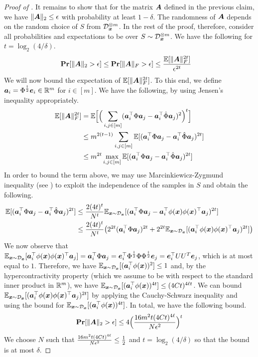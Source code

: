 \begin{proof}[Proof of ]
    It remains to show that for the matrix ${\bm{A}}$ defined in the previous claim, we have $\|{\bm{A}}\|_2 \le {\epsilon}$ with probability at least $1-\delta$. The randomness of ${\bm{A}}$ depends on the random choice of $S$ from ${\mathcal{D}}_{{\bm{x}}}^{\otimes m}$. In the rest of the proof, therefore, consider all probabilities and expectations to be over $S \sim {\mathcal{D}}_{{\bm{x}}}^{\otimes m}$. We have the following for $t = \log_2(4/\delta)$.
    \begin{align*}
        \mathbf{Pr}[\|{\bm{A}}\|_2 > {\epsilon}] &\le \mathbf{Pr}[\|{\bm{A}}\|_F > {\epsilon}] \le \frac{\mathbb{E}[\|{\bm{A}}\|_F^{2t}]}{{\epsilon}^{2t}} 
    \end{align*}
    We will now bound the expectation of $\mathbb{E}[\|{\bm{A}}\|_F^{2t}]$. To this end, we define ${\bm{a}}_i = \Phi^{\frac{\dagger}{2}} {\bm{e}}_i \in \mathbb{R}^m$ for $i\in[m]$. We have the following, by using Jensen's inequality appropriately.
    \begin{align*}
        \mathbb{E}[\|{\bm{A}}\|_F^{2t}] &= \mathbb{E}\Bigr[\Bigr(\sum_{i,j\in[m]} ({\bm{a}}_i^\top \Phi {\bm{a}}_j - {\bm{a}}_i^\top \hat\Phi {\bm{a}}_j)^2 \Bigr)^t\Bigr] \\
        &\le m^{2(t-1)} \sum_{i,j\in[m]}\mathbb{E}[({\bm{a}}_i^\top \Phi {\bm{a}}_j - {\bm{a}}_i^\top \hat\Phi {\bm{a}}_j)^{2t}] \\
        &\le m^{2t} \max_{i,j\in[m]}\mathbb{E}[({\bm{a}}_i^\top \Phi {\bm{a}}_j - {\bm{a}}_i^\top \hat\Phi {\bm{a}}_j)^{2t}]
    \end{align*}
    In order to bound the term above, we may use Marcinkiewicz-Zygmund inequality (see \cite{FERGER201496marcinkiewicz}) to exploit the independence of the samples in $S$ and obtain the following.
    \begin{align*}
        \mathbb{E}[({\bm{a}}_i^\top \Phi {\bm{a}}_j - {\bm{a}}_i^\top \hat\Phi {\bm{a}}_j)^{2t}] &\le \frac{2(4t)^t}{N^t} \mathbb{E}_{{\bm{x}}\sim {\mathcal{D}}_{{\bm{x}}}}[({\bm{a}}_i^\top \Phi {\bm{a}}_j - {\bm{a}}_i^\top \phi({\bm{x}})\phi({\bm{x}})^\top {\bm{a}}_j)^{2t}] \\
        &\le \frac{2(4t)^t}{N^t} \bigr( 2^{2t} ({\bm{a}}_i^\top \Phi {\bm{a}}_j)^{2t} +2^{2t} \mathbb{E}_{{\bm{x}}\sim {\mathcal{D}}_{{\bm{x}}}}[({\bm{a}}_i^\top \phi({\bm{x}})\phi({\bm{x}})^\top {\bm{a}}_j)^{2t}] \bigr)
    \end{align*}
    We now observe that $\mathbb{E}_{{\bm{x}}\sim {\mathcal{D}}_{{\bm{x}}}}[{\bm{a}}_i^\top \phi({\bm{x}})\phi({\bm{x}})^\top {\bm{a}}_j] = {\bm{a}}_i^\top \Phi {\bm{a}}_j = {\bm{e}}_i^\top \Phi^{\frac{\dagger}{2}}\Phi \Phi^{\frac{\dagger}{2}} {\bm{e}}_j = {\bm{e}}_i^\top UU^T {\bm{e}}_j$, which is at most equal to $1$. Therefore, we have $\mathbb{E}_{{\bm{x}}\sim {\mathcal{D}}_{{\bm{x}}}}[({\bm{a}}_i^\top \phi({\bm{x}}))^2] \le 1$ and, by the hypercontractivity property (which we assume to be with respect to the standard inner product in $\mathbb{R}^m$), we have $\mathbb{E}_{{\bm{x}}\sim {\mathcal{D}}_{{\bm{x}}}}[({\bm{a}}_i^\top \phi({\bm{x}}))^{4t}] \le (4Ct)^{4\ell t}$. We can bound $\mathbb{E}_{{\bm{x}}\sim {\mathcal{D}}_{{\bm{x}}}}[({\bm{a}}_i^\top \phi({\bm{x}})\phi({\bm{x}})^\top {\bm{a}}_j)^{2t}]$ by applying the Cauchy-Schwarz inequality and using the bound for $\mathbb{E}_{{\bm{x}}\sim {\mathcal{D}}_{{\bm{x}}}}[({\bm{a}}_i^\top \phi({\bm{x}}))^{4t}]$. In total, we have the following bound.
    \[
        \mathbf{Pr}[\|{\bm{A}}\|_2 > {\epsilon}] \le 4\Bigr(\frac{16 m^2 t (4Ct)^{4\ell}}{N{\epsilon}^2}\Bigr)^t
    \]
    We choose $N$ such that $\frac{16 m^2 t (4Ct)^{4\ell}}{N{\epsilon}^2} \le \frac{1}{2}$ and $t = \log_2(4/\delta)$ so that the bound is at most $\delta$.
\end{proof}

